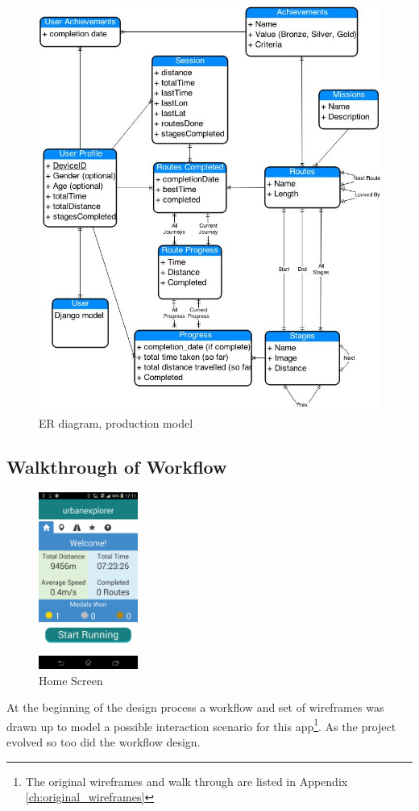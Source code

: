 \begin{figure}[p]
  \centering
  \includegraphics[width=\textwidth]{images/ER_prod.jpg}
  \caption{ER diagram, production model}
  \label{ER_2}
\end{figure}

\newpage

\subsection{Walkthrough of Workflow}
\begin{figure}
  \vspace{-40pt}
  \centering
  \includegraphics[width=0.29\textwidth]{images/screens/home.png}
  \vspace{-20pt}
  \caption{Home Screen}
  \vspace{-25pt}
  \label{fig:home_screen}
\end{figure}
At the beginning of the design process a workflow and set of
wireframes was drawn up to model a possible interaction scenario for 
this app\footnote{The original wireframes and walk through are listed
  in Appendix \ref{ch:original_wireframes}}. As the project evolved so
too did the workflow design. 

